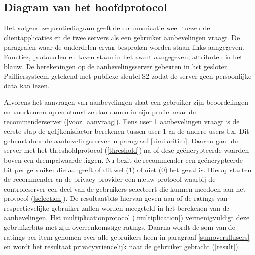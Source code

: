 \subsection{Diagram van het hoofdprotocol}

Het volgend sequentiediagram geeft de communicatie weer tussen de clientapplicaties en de twee servers als een gebruiker aanbevelingen vraagt. De paragrafen waar de onderdelen ervan besproken worden staan links aangegeven. Functies, protocollen en taken staan in het zwart aangegeven, attributen in het blauw. De berekeningen op de aanbevelingsserver gebeuren in het gesloten Pailliersysteem getekend met publieke sleutel S2 zodat de server geen persoonlijke data kan lezen.

Alvorens het aanvragen van aanbevelingen slaat een gebruiker zijn beoordelingen en voorkeuren op en stuurt ze dan samen in zijn profiel naar de recommenderserver (\ref{voor_aanvraag}). Eens user 1 aanbevelingen vraagt is de eerste stap de gelijkenisfactor berekenen tussen user 1 en de andere users Ux. Dit gebeurt door de aanbevelingsserver in paragraaf \ref{similarities}.  Daarna gaat de server met het thresholdprotocol (\ref{threshold}) na of deze ge\"encrypteerde waarden boven een drempelwaarde liggen. Nu bezit de recommender een ge\"encrypteerde bit per gebruiker die aangeeft of dit wel (1) of niet (0) het geval is. Hierop starten de recommender en de privacy provider een nieuw protocol waarbij de controleserver een deel van de gebruikers selecteert die kunnen meedoen aan het protocol (\ref{selection}). De resultaatbits hiervan geven aan of de ratings van respectievelijke gebruiker zullen worden meegeteld in het berekenen van de aanbevelingen. Het multiplicationprotocol (\ref{multiplication}) vermenigvuldigt deze gebruikerbits met zijn overeenkomstige ratings. Daarna wordt de som van de ratings per item genomen over alle gebruikers heen in paragraaf \ref{sumoverallusers} en wordt het resultaat privacyvriendelijk naar de gebruiker gebracht (\ref{result}).
